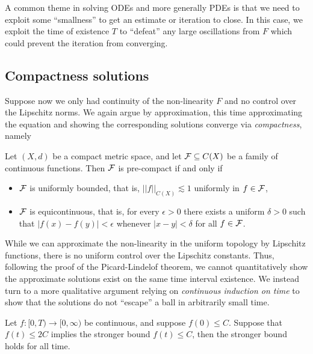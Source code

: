 \begin{remark}
	A common theme in solving ODEs and more generally PDEs is that we need to exploit some ``smallness'' to get an estimate or iteration to close. In this case, we exploit the time of existence $T$ to ``defeat'' any large oscillations from $F$ which could prevent the iteration from converging. 
\end{remark}


\subsection{Compactness solutions}

Suppose now we only had continuity of the non-linearity $F$ and no control over the Lipschitz norms. We again argue by approximation, this time approximating the equation and showing the corresponding solutions converge via \textit{compactness}, namely 

\begin{lemma}
	Let $(X, d)$ be a compact metric space, and let $\mathcal F \subseteq C(X)$ be a family of continuous functions. Then $\mathcal F$ is pre-compact if and only if 
	\begin{itemize}
		\item $\mathcal F$ is uniformly bounded, that is, $||f||_{C(X)} \lesssim 1$ uniformly in $f \in \mathcal F$, 
		\item $\mathcal F$ is equicontinuous, that is, for every $\epsilon > 0$ there exists a uniform $\delta > 0$ such that $|f(x) - f(y)| < \epsilon$ whenever $|x - y| < \delta$ for all $f \in \mathcal F$.
	\end{itemize}
\end{lemma}

While we can approximate the non-linearity in the uniform topology by Lipschitz functions, there is no uniform control over the Lipschitz constants. Thus, following the proof of the Picard-Lindelof theorem, we cannot quantitatively show the approximate solutions exist on the same time interval existence. We instead turn to a more qualitative argument relying on \textit{continuous induction on time} to show that the solutions do not ``escape'' a ball in arbitrarily small time. 

\begin{lemma}
	Let $f : [0, T) \to [0, \infty)$ be continuous, and suppose $f(0) \leq C$. Suppose that $f(t) \leq 2C$ implies the stronger bound $f(t) \leq C$, then the stronger bound holds for all time. 
\end{lemma}

